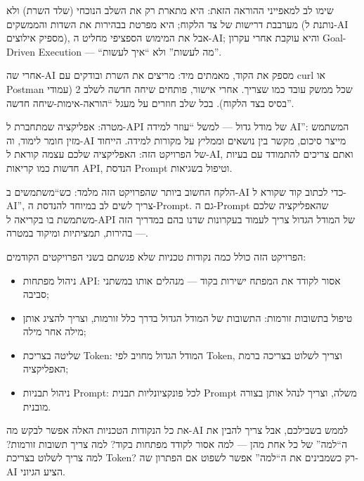 שימו לב למאפייני ההוראה הזאת: היא מתארת רק את השלב הנוכחי (שלד השרת) ולא מערבבת דרישות של צד הלקוח; היא מפרטת בבהירות את השדות והממשקים (נותנת ל-AI מספיק אילוצים), אבל את המימוש הספציפי מחליט ה-AI; והיא עוקבת אחרי עקרון Goal-Driven Execution — “מה לעשות” ולא “איך לעשות”.

אחרי שה-AI מספק את הקוד, מאמתים מיד: מריצים את השרת ובודקים עם curl או Postman שכל ממשק עובד כמו שצריך. אחרי אישור, פותחים שיחה חדשה לשלב 2 (עמודי בסיס בצד הלקוח). בכל שלב חוזרים על מעגל “הוראה-אימות-שיחה חדשה”.



מטרה: אפליקציה שמתחברת ל-API של מודל גדול — למשל “עוזר למידה AI”: המשתמש מזין חומר לימוד, וה-AI מייצר סיכום, מקשר בין נושאים וממליץ על מקורות למידה. הייחוד של הפרויקט הזה: האפליקציה שלכם עצמה קוראת ל-AI, ואתם צריכים להתמודד עם בעיות חדשות כמו קריאות API, הנדסת Prompt וטיפול בשגיאות.

הלקח החשוב ביותר שהפרויקט הזה מלמד: כש“משתמשים ב-AI כדי לכתוב קוד שקורא ל-AI”, צריך לשים לב במיוחד להנדסת ה-Prompt. גם ה-Prompt שהאפליקציה שלכם משתמשת בו בקריאה ל-API של המודל הגדול צריך לעמוד בעקרונות שדנו בהם במדריך הזה — בהירות, תמציתיות ומיקוד במטרה.


הפרויקט הזה כולל כמה נקודות טכניות שלא פגשתם בשני הפרויקטים הקודמים:

\begin{itemize}
  \item ניהול מפתחות API: אסור לקודד את המפתח ישירות בקוד — מנהלים אותו במשתני סביבה;
  \item טיפול בתשובות זורמות: התשובות של המודל הגדול בדרך כלל זורמות, וצריך להציג אותן מילה אחר מילה;
  \item שליטה בצריכת Token: המודל הגדול מחויב לפי Token, וצריך לשלוט בצריכה ברמת האפליקציה;
  \item ניהול תבניות Prompt: לכל פונקציונליות תבנית Prompt משלה, וצריך לנהל אותן בצורה מובנית.
\end{itemize}

את כל הנקודות הטכניות האלה אפשר לבקש מה-AI לממש בשבילכם, אבל צריך להבין את ה“למה” של כל אחת מהן — למה אסור לקודד מפתחות בקוד? למה צריך תשובות זורמות? למה צריך לשלוט בצריכת Token? רק כשמבינים את ה“למה” אפשר לשפוט אם הפתרון שה-AI הציע הגיוני.



